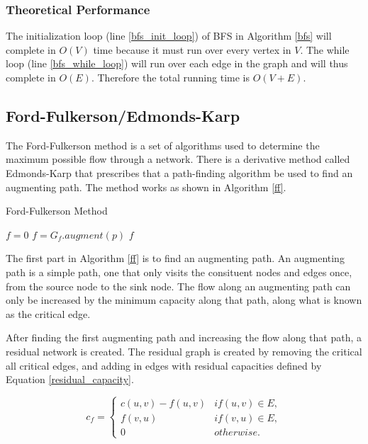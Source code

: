 \documentclass[conference]{IEEEtran}
\begin{document}
\subsubsection{Theoretical Performance}
The initialization loop (line \ref{bfs_init_loop}) of BFS in Algorithm \ref{bfs} 
will complete in $O(V)$ time because it must run over every vertex in $V$. 
The while loop (line \ref{bfs_while_loop}) will run over each edge in the 
graph and will thus complete in $O(E)$. Therefore the total running time is
$O(V+E)$.


\subsection{Ford-Fulkerson/Edmonds-Karp}
The Ford-Fulkerson method is a set of algorithms used to determine the maximum 
possible flow through a network. There is a derivative method called Edmonds-Karp 
that prescribes that a path-finding algorithm be used to find an augmenting path. 
The method works as shown in Algorithm \ref{ff}.
 

\begin{algorithm}
\caption{Ford-Fulkerson Method \cite{b1}}\label{ff}
	\begin{algorithmic}[1]
			\State $f = 0$
				\State $f = G_f.augment(p)$
			\EndWhile
			\State \Return $f$
		\EndFunction
	\end{algorithmic}
\end{algorithm}

The first part in Algorithm \ref{ff} is to find an augmenting path. An augmenting 
path is a simple path, one that only visits the consituent nodes and edges once, 
from the source node to the sink node. The flow along an augmenting path can only be 
increased by the minimum capacity along that path, along what is known as the critical
edge. 

After finding the first augmenting path and increasing the flow along that path, a 
residual network is created. The residual graph is created by removing the critical
all critical edges, and adding in edges with residual capacities defined by Equation 
\ref{residual_capacity}.

\begin{equation}
\label{residual_capacity}
c_f = \begin{cases}
		c(u,v) - f(u,v) & if (u,v) \in E,\\
		f(v,u) & if (v,u) \in E,\\
		0 & otherwise.
	\end{cases}
\end{equation}
\end{document}
